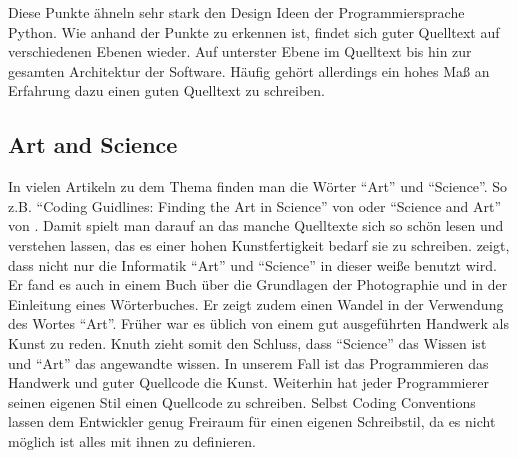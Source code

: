Diese Punkte ähneln sehr stark den Design Ideen der Programmiersprache Python\cite{Peters}.
Wie anhand der Punkte zu erkennen ist, findet sich guter Quelltext auf verschiedenen Ebenen wieder. Auf unterster Ebene im Quelltext bis hin zur gesamten Architektur der Software. Häufig gehört allerdings ein hohes Maß an Erfahrung dazu einen guten Quelltext zu schreiben.


\subsection{Art and Science}

In vielen Artikeln zu dem Thema finden man die Wörter \enquote{Art} und \enquote{Science}. So z.B.
\enquote{Coding Guidlines: Finding the Art in Science} von \cite{Green} oder \enquote{Science and Art} von \cite[S. 669]{Knuth}.
Damit spielt man darauf an das manche Quelltexte sich so schön lesen und verstehen lassen, das es einer hohen Kunstfertigkeit bedarf sie zu schreiben. \cite[S. 669]{Knuth} zeigt, dass nicht nur die Informatik \enquote{Art} und \enquote{Science} in dieser weiße benutzt wird. Er fand es auch in einem Buch über die Grundlagen der Photographie und in der Einleitung eines Wörterbuches\cite[S. 669]{Knuth}.
Er zeigt zudem einen Wandel in der Verwendung des Wortes \enquote{Art}.
Früher war es üblich von einem gut ausgeführten Handwerk als Kunst zu reden.
Knuth zieht somit den Schluss, dass \enquote{Science} das Wissen ist und \enquote{Art} das angewandte wissen.
In unserem Fall ist das Programmieren das Handwerk und guter Quellcode die Kunst.
Weiterhin hat jeder Programmierer seinen eigenen Stil einen Quellcode zu schreiben.
Selbst Coding Conventions lassen dem Entwickler genug Freiraum für einen eigenen Schreibstil, da es nicht möglich ist alles mit ihnen zu definieren.


